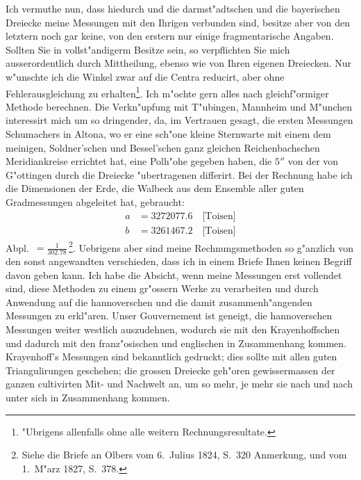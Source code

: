 \documentclass[12pt,a4paper]{article}
\theoremstyle{plain}
\theoremstyle{definition}
\theoremstyle{remark}
\begin{document}
Ich vermuthe nun, dass hiedurch und die darmst"adtschen und die bayerischen Dreiecke meine Messungen mit den Ihrigen verbunden sind, besitze aber von den letztern noch gar keine, von den erstern nur einige fragmentarische Angaben. Sollten Sie in vollst"andigerm Besitze sein, so verpflichten Sie mich ausserordentlich durch Mittheilung, ebenso wie von Ihren eigenen Dreiecken. Nur w"unschte ich die Winkel zwar auf die Centra reducirt, aber ohne Fehlerausgleichung zu erhalten\footnote{"Ubrigens allenfalls ohne alle weitern Rechnungsresultate.}. Ich m"ochte gern alles nach gleichf"ormiger Methode berechnen. Die Verkn"upfung mit T"ubingen, Mannheim und M"unchen interessirt mich um so dringender, da, im Vertrauen gesagt, die ersten Messungen Schumachers in Altona, wo er eine sch"one kleine Sternwarte mit einem dem meinigen, Soldner'schen und Bessel'schen ganz gleichen Reichenbachschen Meridiankreise errichtet hat, eine Polh"ohe gegeben haben, die $5''$ von der von G"ottingen durch die Dreiecke "ubertragenen differirt. Bei der Rechnung habe ich die Dimensionen der Erde, die Walbeck aus dem Ensemble aller guten Gradmessungen abgeleitet hat, gebraucht:
\begin{align*}
a &= 3272077.6 \quad \text{[Toisen]} \\
b &= 3261467.2 \quad \text{[Toisen]}
\end{align*}
Abpl.\ $= \frac{1}{302.78}$\,\footnote{Siehe die Briefe an Olbers vom 6.~Julius 1824, S.~320 Anmerkung, und vom 1.~M"arz 1827, S.~378.}. Uebrigens aber sind meine Rechnungsmethoden so g"anzlich von den sonst angewandten verschieden, dass ich in einem Briefe Ihnen keinen Begriff davon geben kann. Ich habe die Absicht, wenn meine Messungen erst vollendet sind, diese Methoden zu einem gr"ossern Werke zu verarbeiten und durch Anwendung auf die hannoverschen und die damit zusammenh"angenden Messungen zu erkl"aren. Unser Gouvernement ist geneigt, die hannoverschen Messungen weiter westlich auszudehnen, wodurch sie mit den Krayenhoffschen und dadurch mit den franz"osischen und englischen in Zusammenhang kommen. Krayenhoff's Messungen sind bekanntlich gedruckt; dies sollte mit allen guten Triangulirungen geschehen; die grossen Dreiecke geh"oren gewissermassen der ganzen cultivirten Mit- und Nachwelt an, um so mehr, je mehr sie nach und nach unter sich in Zusammenhang kommen.
\end{document}
